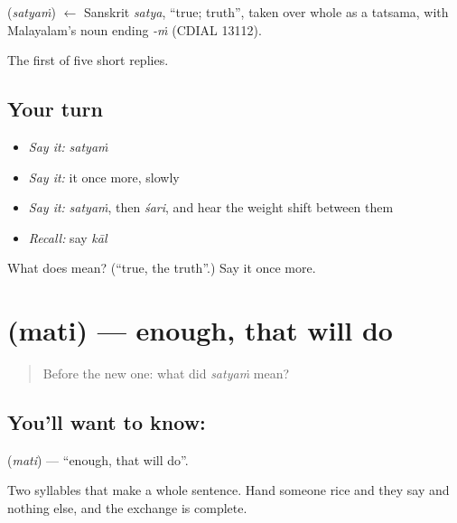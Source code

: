 \begin{cousinweb}
\textbf{} (\emph{satyaṁ}) $\leftarrow$ Sanskrit \emph{satya}, \textquotedblleft{}true; truth\textquotedblright{}, taken over whole as a tatsama, with Malayalam's noun ending \emph{-ṁ} (CDIAL 13112).
\end{cousinweb}

\begin{grammarlens}[title={What you've built}]
The first of five short replies.
\end{grammarlens}

\subsection*{Your turn}
\begin{itemize}
\raggedright
  \item \emph{Say it:} \emph{satyaṁ}
  \item \emph{Say it:} it once more, slowly
  \item \emph{Say it:} \emph{satyaṁ}, then \emph{śari}, and hear the weight shift between them
  \item \emph{Recall:} say \emph{kāl}
\end{itemize}

\begin{tcolorbox}[breakable,colback=teal!4,colframe=teal!35!black,title={Before you move on}]
What does  mean? (\textquotedblleft{}true, the truth\textquotedblright{}.) Say it once more.
\end{tcolorbox}
\section[\texorpdfstring{\ml{മതി} (mati)}{മതി (mati)}]{ (mati) — enough, that will do}

\label{lesson:ML-C49-enough}



\begin{quote}
Before the new one: what did \emph{satyaṁ} mean?
\end{quote}

\subsection*{You'll want to know: }
\textbf{} (\emph{mati}) — \textquotedblleft{}enough, that will do\textquotedblright{}.

Two syllables that make a whole sentence. Hand someone rice and they say  and nothing else, and the exchange is complete.

